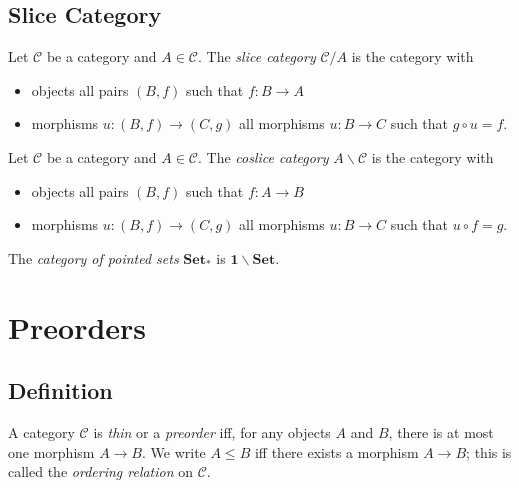 \section{Slice Category}

\begin{df}
Let $\mathcal{C}$ be a category and $A \in \mathcal{C}$. The \emph{slice category} $\mathcal{C} / A$ is the category with
\begin{itemize}
\item objects all pairs $(B,f)$ such that $f : B \rightarrow A$
\item morphisms $u : (B,f) \rightarrow (C,g)$ all morphisms $u : B \rightarrow C$ such that $g \circ u = f$.
\end{itemize}
\end{df}

\begin{df}
Let $\mathcal{C}$ be a category and $A \in \mathcal{C}$. The \emph{coslice category} $A \backslash \mathcal{C}$ is the category with
\begin{itemize}
\item objects all pairs $(B,f)$ such that $f : A \rightarrow B$
\item morphisms $u : (B,f) \rightarrow (C,g)$ all morphisms $u : B \rightarrow C$ such that $u \circ f = g$.
\end{itemize}
\end{df}

\begin{ex}
The \emph{category of pointed sets} $\mathbf{Set}_*$ is $\mathbf{1} \backslash \mathbf{Set}$.
\end{ex}

\chapter{Preorders}

\section{Definition}

\begin{df}
A category $\mathcal{C}$ is \emph{thin} or a \emph{preorder} iff, for any objects $A$ and $B$, there is at most one morphism $A \rightarrow B$. We write $A \leq B$ iff there exists a morphism $A \rightarrow B$; this is called the \emph{ordering relation} on $\mathcal{C}$.
\end{df}

